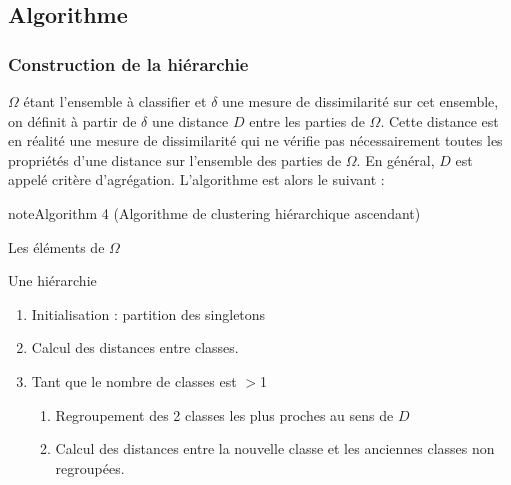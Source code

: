 \documentclass[letterpaper,10pt,french]{sphinxmanual}
\begin{document}
\subsection{Algorithme}
\label{\detokenize{clustering:algorithme}}
\ignorespaces 

\subsubsection{Construction de la hiérarchie}
\label{\detokenize{clustering:construction-de-la-hierarchie}}\label{\detokenize{clustering:index-2}}
\sphinxAtStartPar
\(\Omega\)  étant l’ensemble à classifier et \(\delta\) une mesure de dissimilarité sur cet ensemble, on définit à partir de \(\delta\) une  distance \(D\) entre les parties de  \(\Omega\). Cette distance est en réalité une mesure de dissimilarité qui ne vérifie pas nécessairement toutes les propriétés d’une distance sur l’ensemble des parties de \(\Omega\). En général, \(D\) est appelé critère d’agrégation.
L’algorithme est alors le suivant :
\label{clustering:algorithm-3}
\begin{sphinxadmonition}{note}{Algorithm 4 (Algorithme de clustering hiérarchique ascendant)}



\sphinxAtStartPar
{} Les éléments de \(\Omega\)

\sphinxAtStartPar
{} Une hiérarchie
\begin{enumerate}
%
\item {} 
\sphinxAtStartPar
Initialisation : partition des singletons

\item {} 
\sphinxAtStartPar
Calcul des distances entre classes.

\item {} 
\sphinxAtStartPar
Tant que le nombre de classes est \(>\)1
\begin{enumerate}
%
\item {} 
\sphinxAtStartPar
Regroupement des 2 classes les plus proches au sens de \(D\)

\item {} 
\sphinxAtStartPar
Calcul des distances entre la nouvelle classe et les anciennes classes non regroupées.

\end{enumerate}

\end{enumerate}
\end{sphinxadmonition}
\end{document}
